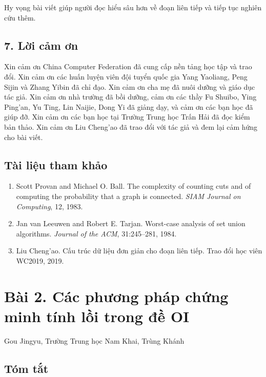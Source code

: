\documentclass[11pt]{article}
\begin{document}
Hy vọng bài viết giúp người đọc hiểu sâu hơn về đoạn liên tiếp và tiếp tục
nghiên cứu thêm.

\subsection*{7. Lời cảm ơn}

Xin cảm ơn China Computer Federation đã cung cấp nền tảng học tập và trao đổi.
Xin cảm ơn các huấn luyện viên đội tuyển quốc gia Yang Yaoliang, Peng Sijin và
Zhang Yibin đã chỉ đạo. Xin cảm ơn cha mẹ đã nuôi dưỡng và giáo dục tác giả.
Xin cảm ơn nhà trường đã bồi dưỡng, cảm ơn các thầy Fu Shuibo, Ying Ping'an,
Yu Ting, Lin Naijie, Dong Yi đã giảng dạy, và cảm ơn các bạn học đã giúp đỡ.
Xin cảm ơn các bạn học tại Trường Trung học Trấn Hải đã đọc kiểm bản thảo.
Xin cảm ơn Liu Cheng'ao đã trao đổi với tác giả và đem lại cảm hứng cho bài
viết.

\subsection*{Tài liệu tham khảo}

\begin{enumerate}
  \item Scott Provan and Michael O. Ball. The complexity of counting cuts and
  of computing the probability that a graph is connected. \emph{SIAM Journal
  on Computing}, 12, 1983.
  \item Jan van Leeuwen and Robert E. Tarjan. Worst-case analysis of set union
  algorithms. \emph{Journal of the ACM}, 31:245--281, 1984.
  \item Liu Cheng'ao. Cấu trúc dữ liệu đơn giản cho đoạn liên tiếp. Trao đổi
  học viên WC2019, 2019.
\end{enumerate}

\section*{Bài 2. Các phương pháp chứng minh tính lồi trong đề OI}

\begin{center}
Gou Jingyu, Trường Trung học Nam Khai, Trùng Khánh
\end{center}

\subsection*{Tóm tắt}
\end{document}
